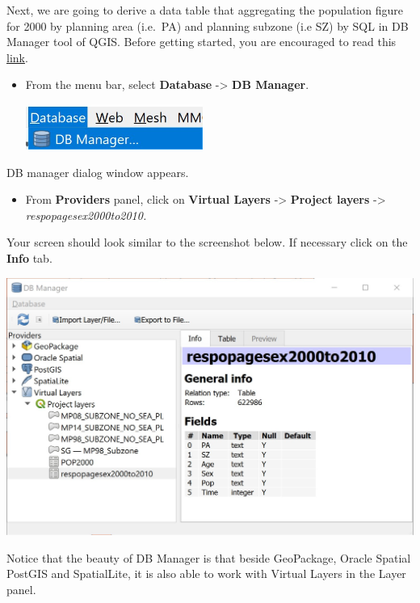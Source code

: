 \documentclass[
  letterpaper,
  DIV=11,
  numbers=noendperiod]{scrreprt}
\providecommand{\tightlist}{%
  \setlength{\itemsep}{0pt}\setlength{\parskip}{0pt}}\usepackage{longtable,booktabs,array}
\begin{document}
Next, we are going to derive a data table that aggregating the
population figure for 2000 by planning area (i.e.~PA) and planning
subzone (i.e SZ) by SQL in DB Manager tool of QGIS. Before getting
started, you are encouraged to read this
\href{https://docs.qgis.org/3.22/en/docs/user_manual/plugins/core_plugins/plugins_db_manager.html}{link}.

\begin{itemize}
\item
  From the menu bar, select \textbf{Database} -\textgreater{} \textbf{DB
  Manager}.

  \includegraphics[width=2.28125in,height=\textheight]{./img03/image41.jpg}
\end{itemize}

DB manager dialog window appears.

\begin{itemize}
\tightlist
\item
  From \textbf{Providers} panel, click on \textbf{Virtual Layers}
  -\textgreater{} \textbf{Project layers} -\textgreater{}
  \emph{respopagesex2000to2010.}
\end{itemize}

Your screen should look similar to the screenshot below. If necessary
click on the \textbf{Info} tab.

\includegraphics{./img03/image42.jpg}

Notice that the beauty of DB Manager is that beside GeoPackage, Oracle
Spatial PostGIS and SpatialLite, it is also able to work with Virtual
Layers in the Layer panel.
\end{document}
